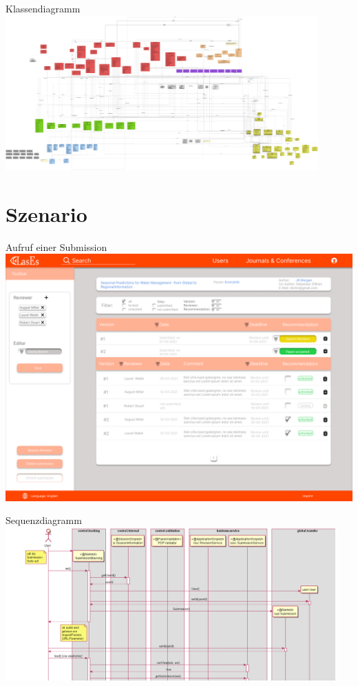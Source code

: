 \documentclass{beamer}
\begin{document}
    \begin{frame}{Klassendiagramm}
        \centering
        \includegraphics[width=0.9\textwidth]{../../docs/Entwurf/graphics/klassendiagramm_png.png}
    \end{frame}



    \section{Szenario}
    \begin{frame}{Aufruf einer Submission}
        \centering
        \includegraphics[width=\textwidth]{../../docs/Pflichtenheft/graphics/Submission-png.png}
    \end{frame}

    \begin{frame}{Sequenzdiagramm}
        \centering
        \includegraphics[width=0.95\textwidth]{excerpts/sequence1_1}
    \end{frame}
\end{document}

